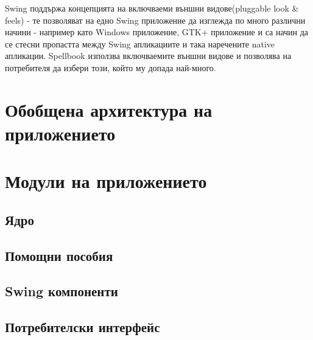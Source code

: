 Swing поддържа концепцията на включваеми външни видове(pluggable look
\& feels) - те позволяват на едно Swing приложение да изглежда по
много различни начини - например като Windows приложение, GTK+
приложение и са начин да се стесни пропастта между Swing апликациите и
така наречените native апликации. Spellbook използва включваемите
външни видове и позволява на потребителя да избери този, който му
допада най-много.
\section{Обобщена архитектура на приложението}
\section{Модули на приложението}
\subsection{Ядро}
\subsection{Помощни пособия}
\subsection{Swing компоненти}
\subsection{Потребителски интерфейс}

